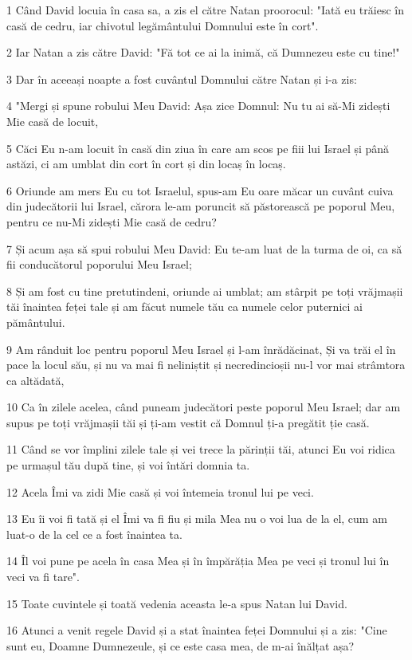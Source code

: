 \par 1 Când David locuia în casa sa, a zis el către Natan proorocul: "Iată eu trăiesc în casă de cedru, iar chivotul legământului Domnului este în cort".
\par 2 Iar Natan a zis către David: "Fă tot ce ai la inimă, că Dumnezeu este cu tine!"
\par 3 Dar în aceeași noapte a fost cuvântul Domnului către Natan și i-a zis:
\par 4 "Mergi și spune robului Meu David: Așa zice Domnul: Nu tu ai să-Mi zidești Mie casă de locuit,
\par 5 Căci Eu n-am locuit în casă din ziua în care am scos pe fiii lui Israel și până astăzi, ci am umblat din cort în cort și din locaș în locaș.
\par 6 Oriunde am mers Eu cu tot Israelul, spus-am Eu oare măcar un cuvânt cuiva din judecătorii lui Israel, cărora le-am poruncit să păstorească pe poporul Meu, pentru ce nu-Mi zidești Mie casă de cedru?
\par 7 Și acum așa să spui robului Meu David: Eu te-am luat de la turma de oi, ca să fii conducătorul poporului Meu Israel;
\par 8 Și am fost cu tine pretutindeni, oriunde ai umblat; am stârpit pe toți vrăjmașii tăi înaintea feței tale și am făcut numele tău ca numele celor puternici ai pământului.
\par 9 Am rânduit loc pentru poporul Meu Israel și l-am înrădăcinat, Și va trăi el în pace la locul său, și nu va mai fi neliniștit și necredincioșii nu-l vor mai strâmtora ca altădată,
\par 10 Ca în zilele acelea, când puneam judecători peste poporul Meu Israel; dar am supus pe toți vrăjmașii tăi și ți-am vestit că Domnul ți-a pregătit ție casă.
\par 11 Când se vor împlini zilele tale și vei trece la părinții tăi, atunci Eu voi ridica pe urmașul tău după tine, și voi întări domnia ta.
\par 12 Acela Îmi va zidi Mie casă și voi întemeia tronul lui pe veci.
\par 13 Eu îi voi fi tată și el Îmi va fi fiu și mila Mea nu o voi lua de la el, cum am luat-o de la cel ce a fost înaintea ta.
\par 14 Îl voi pune pe acela în casa Mea și în împărăția Mea pe veci și tronul lui în veci va fi tare".
\par 15 Toate cuvintele și toată vedenia aceasta le-a spus Natan lui David.
\par 16 Atunci a venit regele David și a stat înaintea feței Domnului și a zis: "Cine sunt eu, Doamne Dumnezeule, și ce este casa mea, de m-ai înălțat așa?
